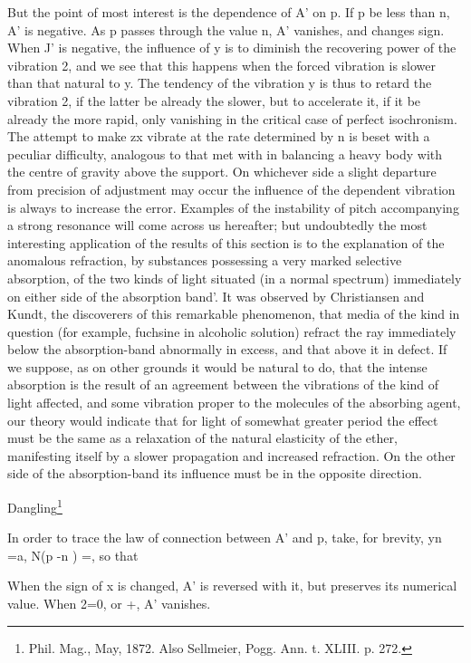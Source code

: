 But the point of most interest is the dependence of A' on p. If p be less than
n, A' is negative. As p passes through the value n, A' vanishes, and changes
sign. When J' is negative, the influence of y is to diminish the recovering
power of the vibration 2, and we see that this happens when the forced
vibration is slower than that natural to y.  The tendency of the vibration y is
thus to retard the vibration 2, if the latter be already the slower, but to
accelerate it, if it be already the more rapid, only vanishing in the critical
case of perfect isochronism. The attempt to make zx vibrate at the rate
determined by n is beset with a peculiar difficulty, analogous to that met with
in balancing a heavy body with the centre of gravity above the support. On
whichever side a slight departure from precision of adjustment may occur the
influence of the dependent vibration is always to increase the error. Examples
of the instability of pitch accompanying a strong resonance will come across us
hereafter; but undoubtedly the most interesting application of the results of
this section is to the explanation of the anomalous refraction, by substances
possessing a very marked selective absorption, of the two kinds of light
situated (in a normal spectrum) immediately on either side of the absorption
band'. It was observed by Christiansen and Kundt, the discoverers of this
remarkable phenomenon, that media of the kind in question (for example,
fuchsine in alcoholic solution) refract the ray immediately below the
absorption-band abnormally in excess, and that above it in defect. If we
suppose, as on other grounds it would be natural to do, that the intense
absorption is the result of an agreement between the vibrations of the kind of
light affected, and some vibration proper to the molecules of the absorbing
agent, our theory would indicate that for light of somewhat greater period the
effect must be the same as a relaxation of the natural elasticity of the ether,
manifesting itself by a slower propagation and increased refraction. On the
other side of the absorption-band its influence must be in the opposite
direction.

Dangling\footnote{ Phil. Mag., May, 1872. Also Sellmeier, Pogg. Ann. t. XLIII. p. 272.}

In order to trace the law of connection between A' and p, take, for brevity, yn
=a, N(p -n ) =, so that

When the sign of x is changed, A' is reversed with it, but preserves its
numerical value. When 2=0, or +, A' vanishes.

